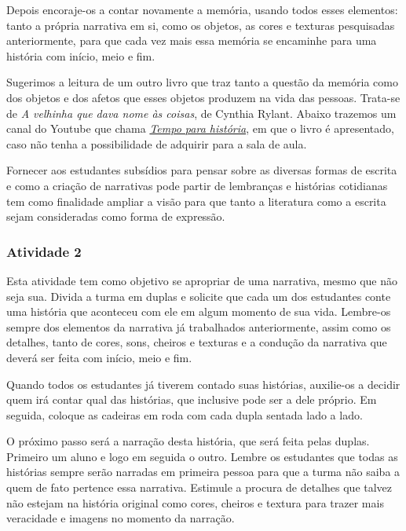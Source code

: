 \documentclass[11pt]{extarticle}
\begin{document}
Depois encoraje-os a contar novamente a memória, usando todos esses elementos: tanto a própria narrativa em si, como os objetos, as cores e texturas pesquisadas anteriormente, para que cada vez mais essa memória se encaminhe para uma história com início, meio e fim. 

Sugerimos a leitura de um outro livro que traz tanto a questão da memória como dos objetos e dos afetos que esses objetos produzem na vida das pessoas. Trata-se de \textit{A velhinha que dava nome às coisas}, de Cynthia Rylant. Abaixo trazemos um canal do Youtube que chama \href{https://youtu.be/oMLLpEJA2xg}{\textit{Tempo para história}}, em que o livro é apresentado, caso não tenha a possibilidade de adquirir para a sala de aula. 


Fornecer aos estudantes subsídios para pensar sobre as diversas formas de escrita e como a criação de narrativas pode partir de lembranças e histórias cotidianas tem como finalidade ampliar a visão para que tanto a literatura como a escrita sejam consideradas como forma de expressão.

\subsubsection{Atividade 2}


Esta atividade tem como objetivo se apropriar de uma narrativa, mesmo que não seja sua. Divida a turma em duplas e solicite que cada um dos estudantes conte uma história que aconteceu com ele em algum momento de sua vida. Lembre-os sempre dos elementos da narrativa já trabalhados anteriormente, assim como os detalhes, tanto de cores, sons, cheiros e texturas e a condução da narrativa que deverá ser feita com início, meio e fim. 

Quando todos os estudantes já tiverem contado suas histórias, auxilie-os a decidir quem irá contar qual das histórias, que inclusive pode ser a dele próprio. Em seguida, coloque as cadeiras em roda com cada dupla sentada lado a lado. 

O próximo passo será a narração desta história, que será feita pelas duplas. Primeiro um aluno e logo em seguida o outro. Lembre os estudantes que todas as histórias sempre serão narradas em primeira pessoa para que a turma não saiba a quem de fato pertence essa narrativa. Estimule a procura de detalhes que talvez não estejam na história original como cores, cheiros e textura para trazer mais veracidade e imagens no momento da narração. 
\end{document}
